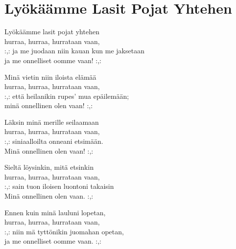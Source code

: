 \section{Lyökäämme Lasit Pojat Yhtehen}
Lyökäämme lasit pojat yhtehen\\
hurraa, hurraa, hurrataan vaan,\\
:,: ja me juodaan niin kauan kun me jaksetaan\\
ja me onnelliset oomme vaan! :,:

Minä vietin niin iloista elämää\\
hurraa, hurraa, hurrataan vaan,\\
:,: että heilanikin rupes’ mua epäilemään;\\
minä onnellinen olen vaan! :,:

Läksin minä merille seilaamaan\\
hurraa, hurraa, hurrataan vaan,\\
:,: siniaalloilta onneani etsimään.\\
Minä onnellinen olen vaan! :,:

Sieltä löysinkin, mitä etsinkin\\
hurraa, hurraa, hurrataan vaan,\\
:,: sain tuon iloisen luontoni takaisin\\
Minä onnellinen olen vaan. :,:

Ennen kuin minä lauluni lopetan,\\
hurraa, hurraa, hurrataan vaan,\\
:,: niin mä tyttönikin juomahan opetan,\\
ja me onnelliset oomme vaan. :,: